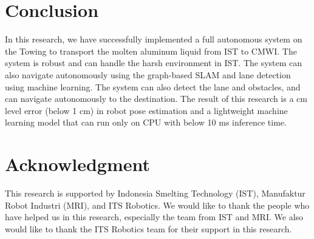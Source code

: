 \documentclass[conference]{IEEEtran}
\begin{document}
\section{Conclusion} 
In this research, we have successfully implemented a full autonomous system on the Towing to transport the molten aluminum liquid from IST to CMWI. The system is robust and can handle the harsh environment in IST. The system can also navigate autonomously using the graph-based SLAM and lane detection using machine learning. The system can also detect the lane and obstacles, and can navigate autonomously to the destination. The result of this research is a cm level error (below 1 cm) in robot pose estimation and a lightweight machine learning model that can run only on CPU with below 10 ms inference time. 

\section{Acknowledgment}
This research is supported by Indonesia Smelting Technology (IST), Manufaktur Robot Industri (MRI), and ITS Robotics. We would like to thank the people who have helped us in this research, especially the team from IST and MRI. We also would like to thank the ITS Robotics team for their support in this research. 





\end{document}
